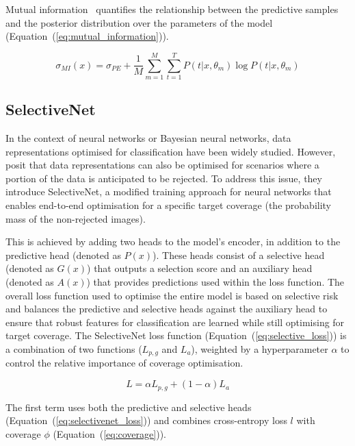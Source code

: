 \noindent Mutual information~\citep{houlsby2011bayesian} quantifies the relationship between the predictive samples and the posterior distribution over the parameters of the model (Equation~(\ref{eq:mutual_information})).

\begin{equation}
	\sigma_{MI}(x) = \sigma_{PE} + \frac{1}{M}\sum^M_{m=1}\sum^T_{t=1}P(t|x,\theta_m)\log P(t|x,\theta_m)
	\label{eq:mutual_information}
\end{equation}

\subsection{SelectiveNet}
\label{subsec:selectivenet}
In the context of neural networks or Bayesian neural networks, data representations optimised for classification have been widely studied. However, \cite{geifman2019selectivenet} posit that data representations can also be optimised for scenarios where a portion of the data is anticipated to be rejected. To address this issue, they introduce SelectiveNet, a modified training approach for neural networks that enables end-to-end optimisation for a specific target coverage (the probability mass of the non-rejected images).

This is achieved by adding two heads to the model's encoder, in addition to the predictive head (denoted as $P(x)$). These heads consist of a selective head (denoted as $G(x)$) that outputs a selection score and an auxiliary head (denoted as $A(x)$) that provides predictions used within the loss function. The overall loss function used to optimise the entire model is based on selective risk and balances the predictive and selective heads against the auxiliary head to ensure that robust features for classification are learned while still optimising for target coverage. The SelectiveNet loss function (Equation~(\ref{eq:selective_loss})) is a combination of two functions ($L_{p,g}$ and $L_a$), weighted by a hyperparameter $\alpha$ to control the relative importance of coverage optimisation.

\begin{equation}
	L = \alpha L_{p, g} + (1 - \alpha)L_a
	\label{eq:selective_loss}
\end{equation}

The first term uses both the predictive and selective heads (Equation~(\ref{eq:selectivenet_loss})) and combines cross-entropy loss $l$ with coverage $\phi$ (Equation~(\ref{eq:coverage})). 

